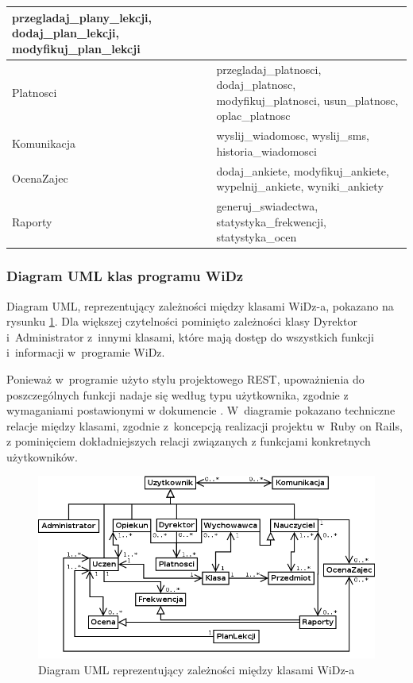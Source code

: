 \documentclass[12pt,leqno,twoside]{mwart}
\begin{document}
\begin{table}[h]
\begin{tabular}{|l|p{12cm}|}
{				przegladaj\_plany\_lekcji, dodaj\_plan\_lekcji, modyfikuj\_plan\_lekcji 
			}\\ \hline
		Platnosci &
			\parbox[t]{12cm}{
			\raggedright			
				przegladaj\_platnosci, dodaj\_platnosc, modyfikuj\_platnosci, usun\_platnosc, oplac\_platnosc 
			}\\ \hline
		Komunikacja & wyslij\_wiadomosc, wyslij\_sms, historia\_wiadomosci \\ \hline
		OcenaZajec &
			\parbox[t]{12cm}{
			\raggedright			
				dodaj\_ankiete, modyfikuj\_ankiete, wypelnij\_ankiete, wyniki\_ankiety 
			}\\ \hline
		Raporty & generuj\_swiadectwa, statystyka\_frekwencji, statystyka\_ocen \\ \hline
		\end{tabular}
	\label{kluczowe_klasy}
\end{table}

\subsubsection{Diagram UML klas programu WiDz}\label{UML}
\noindent Diagram UML, reprezentujący zależności między klasami WiDz-a, pokazano na rysunku \ref{fig:uml}. Dla większej czytelności pominięto zależności klasy Dyrektor i~Administrator z~innymi klasami, które mają dostęp do wszystkich funkcji i~informacji w~programie WiDz.

\indent Ponieważ w~programie użyto stylu projektowego REST, upoważnienia do poszczególnych funkcji nadaje się według typu użytkownika, zgodnie z wymaganiami postawionymi w dokumencie \cite{WYM}. W~diagramie pokazano techniczne relacje między klasami, zgodnie z~koncepcją realizacji projektu w~Ruby on Rails, z pominięciem dokładniejszych relacji związanych z funkcjami konkretnych użytkowników.
\begin{figure}[ht]
\center
\includegraphics[width=16cm]{uml_klas.png}
\caption{Diagram UML reprezentujący zależności między klasami WiDz-a}
\label{fig:uml}
\end{figure}
\end{document}
